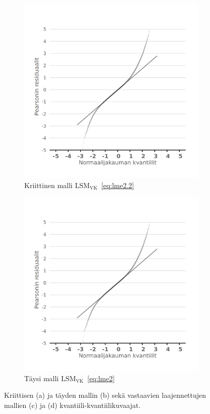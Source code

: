 \documentclass[finnish]{docopts}
\begin{document}
\begin{figure}[H]
\begin{subfigure}[b]{0.4\textwidth}
\centering
  \includegraphics[width=.8\linewidth]{kuvaajat/lme3_vc_qq.png}
  \caption{Kriittinen malli $\text{LSM}_{\text{VK}}$~\ref{eq:lme2.2}}
  \label{fig:lme_vk_krit_qq}
\end{subfigure}%
\begin{subfigure}[b]{0.4\textwidth}
\centering
  \includegraphics[width=.8\linewidth]{kuvaajat/lme3_full_vc_qq.png}
  \caption{Täysi malli $\text{LSM}_{\text{VK}}$~\ref{eq:lme2}}
  \label{fig:lme_vk_taysi_qq}
\end{subfigure}
 \caption{Kriittisen (a) ja täyden mallin (b) sekä vastaavien laajennettujen mallien (c) ja (d) kvantiili-kvantiilikuvaajat.}
   \label{fig:lme_resid_qq}
\end{figure}
\end{document}

